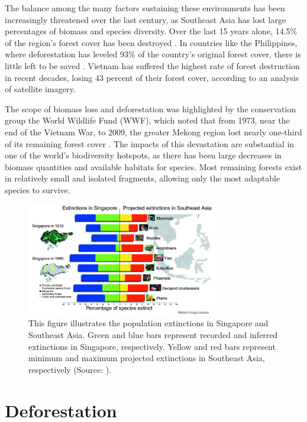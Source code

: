 The balance among the many factors sustaining these environments has been increasingly threatened over the last century, as Southeast Asia has lost large percentages of biomass and species diversity.  Over the last 15 years alone, 14.5\% of the region's forest cover has been destroyed \citep{gullison2007tropical}. In countries like the Philippines, where deforestation has leveled 93\% of the country's original forest cover, there is little left to be saved \citep{sodhi2004southeast}. Vietnam has suffered the highest rate of forest destruction in recent decades, losing 43 percent of their forest cover, according to an analysis of satellite imagery. 

The scope of biomass loss and deforestation was highlighted by the conservation group the World Wildlife Fund (WWF), which noted that from 1973, near the end of the Vietnam War, to 2009, the greater Mekong region lost nearly one-third of its remaining forest cover \citep{sunderland2012evidence}. The impacts of this devastation are substantial in one of the world's biodiversity hotspots, as there has been large decreases in biomass quantities and available habitats for species. Most remaining forests exist in relatively small and isolated fragments, allowing only the most adaptable species to survive.

 \begin{figure}[ht]
    \centering
        \includegraphics[width = 0.75\textwidth]{graphics/extinction.jpg}
        \caption{This figure illustrates the population extinctions in Singapore and Southeast Asia. Green and blue bars represent recorded and inferred extinctions in Singapore, respectively. Yellow and red bars represent minimum and maximum projected extinctions in Southeast Asia, respectively (Source: \citet{sodhi2004southeast}).}
    \end{figure}

\section{Deforestation}

